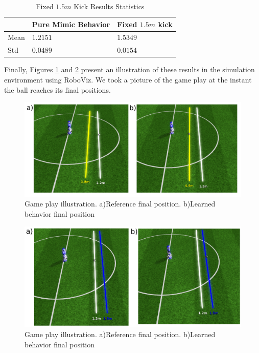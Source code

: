 \begin{table}[ht]
    \begin{tabular}{|l|l|l|}
    \hline
      &     Pure Mimic Behavior  &    Fixed $1.5m$ kick  \\ \hline
    Mean             &    $1.2151$  &   $1.5349$    \\
    Std              &    $0.0489$   &  $0.0154$   \\ \hline
    \end{tabular}
\centering
\caption{Fixed $1.5m$ Kick Results Statistics}
\label{tab:ppo_15_kick_stat}
\end{table}

Finally, Figures \ref{fig:RL_08_kick_roboviz} and \ref{fig:RL_15_kick_roboviz} present an illustration of these results in the simulation environment using RoboViz. We took a picture of the game play at the instant the ball reaches its final positions.

\begin{figure}[H]
    \centering
    \includegraphics[width=1.0\textwidth]{Chapter7/figures/kick_train_08.pdf} 
    \caption{Game play illustration. a)Reference final position. b)Learned behavior final position}
    \label{fig:RL_08_kick_roboviz}
\end{figure}

\begin{figure}[H]
    \centering
    \includegraphics[width=1.0\textwidth]{Chapter7/figures/kick_train_15.pdf} 
    \caption{Game play illustration. a)Reference final position. b)Learned behavior final position}
    \label{fig:RL_15_kick_roboviz}
\end{figure}


